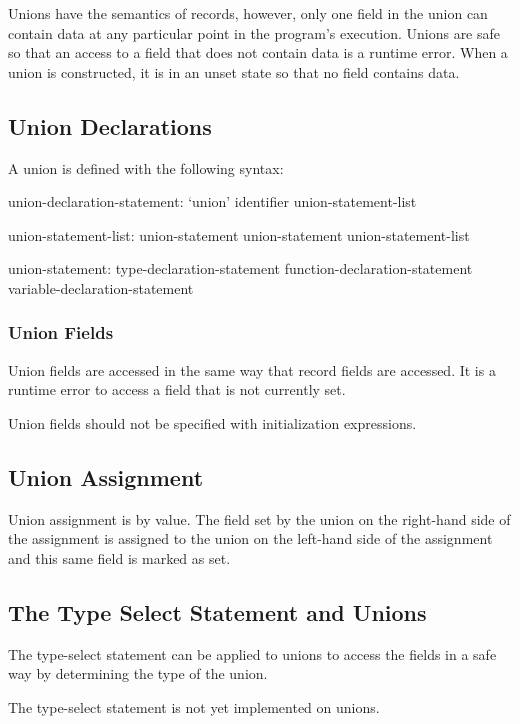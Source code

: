 \label{Unions}

Unions have the semantics of records, however, only one field in the
union can contain data at any particular point in the program's
execution.  Unions are safe so that an access to a field that does not
contain data is a runtime error.  When a union is constructed, it is
in an unset state so that no field contains data.

\subsection{Union Declarations}
\label{Union_Declarations}

A union is defined with the following syntax:
\begin{syntax}
union-declaration-statement:
  `union' identifier { union-statement-list }

union-statement-list:
  union-statement
  union-statement union-statement-list

union-statement:
  type-declaration-statement
  function-declaration-statement
  variable-declaration-statement
\end{syntax}

\subsubsection{Union Fields}
\label{Union_Fields}

Union fields are accessed in the same way that record fields are
accessed.  It is a runtime error to access a field that is not
currently set.

Union fields should not be specified with initialization expressions.

\subsection{Union Assignment}
\label{Union_Assignment}

Union assignment is by value.  The field set by the union on the
right-hand side of the assignment is assigned to the union on the
left-hand side of the assignment and this same field is marked as set.

\subsection{The Type Select Statement and Unions}
\label{The_Type_Select_Statement_and_Unions}

The type-select statement can be applied to unions to access the
fields in a safe way by determining the type of the union.
\begin{implementation}
The type-select statement is not yet implemented on unions.
\end{implementation}
